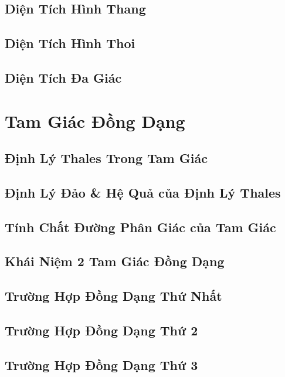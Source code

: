 \documentclass{article}
\numberwithin{equation}{section}
\begin{document}
\subsection{Diện Tích Hình Thang}

\subsection{Diện Tích Hình Thoi}

\subsection{Diện Tích Đa Giác}


\section{Tam Giác Đồng Dạng}

\subsection{Định Lý Thales Trong Tam Giác}

\subsection{Định Lý Đảo \& Hệ Quả của Định Lý Thales}

\subsection{Tính Chất Đường Phân Giác của Tam Giác}

\subsection{Khái Niệm 2 Tam Giác Đồng Dạng}

\subsection{Trường Hợp Đồng Dạng Thứ Nhất}

\subsection{Trường Hợp Đồng Dạng Thứ 2}

\subsection{Trường Hợp Đồng Dạng Thứ 3}
\end{document}
